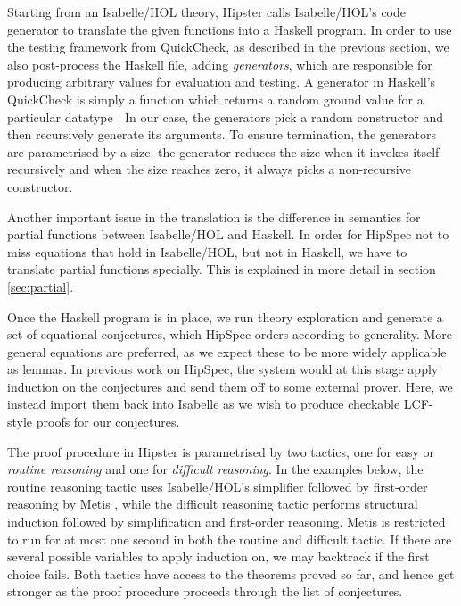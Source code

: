Starting from an Isabelle/HOL theory, Hipster calls Isabelle/HOL's code generator \cite{codegen2,codegen} to translate the given functions into a Haskell program. In order to use the testing framework from QuickCheck, as described in the previous section, we also post-process the Haskell file, adding \emph{generators}, which are responsible for producing arbitrary values for evaluation and testing. A generator in Haskell's QuickCheck is simply a function which returns a random ground value for a particular datatype \cite{quickcheck}. In our case, the generators pick a random constructor and then recursively generate its arguments. To ensure termination, the generators are parametrised by a size; the generator reduces the size when it invokes itself recursively and when the size reaches zero, it always picks a non-recursive constructor. 

Another important issue in the translation is the difference in
semantics for partial functions between Isabelle/HOL and Haskell. In order
for HipSpec not to miss equations that hold in Isabelle/HOL, but not in
Haskell, we have to translate partial functions specially.
This is explained in more detail in section \ref{sec:partial}.

Once the Haskell program is in place, we run theory exploration and generate a set of equational conjectures, which HipSpec orders according to generality. More general equations are preferred, as we expect these to be more widely applicable as lemmas. In previous work on HipSpec, the system would at this stage apply induction on the conjectures and send them off to some external prover. Here, we instead import them back into Isabelle as we wish to produce checkable LCF-style proofs for our conjectures. 

The proof procedure in Hipster is parametrised by two tactics, one for easy or \emph{routine reasoning} and one for \emph{difficult reasoning}. In the examples below, the routine reasoning tactic uses
Isabelle/HOL's simplifier followed by first-order reasoning by Metis
\cite{metis}, while the difficult reasoning tactic performs structural induction followed by simplification and first-order reasoning. 
Metis is restricted to run for at most one second in both the routine and difficult tactic. If there are several possible variables to apply induction on, we may backtrack if the first choice fails. Both tactics have access to the theorems proved so far, and hence get stronger as the proof procedure proceeds through the list of conjectures. 

